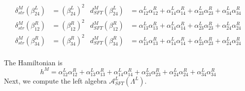 \documentclass[a4paper,final, reqno]{amsart}
\theoremstyle{plain}
\theoremstyle{definition}
\newcommand{\A}{\mathcal{A}}
\begin{document}
\begin{align*}
			\delta_{str}^M(\beta_{24}^L) &= \left(\beta_{24}^L\right)^2 & d_{SFT}^M(\beta_{24}^L) &= \alpha_{12}^L\alpha_{12}^R + \alpha_{14}^L\alpha_{14}^R + \alpha_{23}^L\alpha_{23}^R + \alpha_{34}^L\alpha_{34}^R \\
			\delta_{str}^M(\beta_{12}^R) &= \left(\beta_{12}^R\right)^2 & d_{SFT}^M(\beta_{12}^R) &= \alpha_{13}^L\alpha_{13}^R + \alpha_{14}^L\alpha_{14}^R + \alpha_{23}^L\alpha_{23}^R + \alpha_{24}^L\alpha_{24}^R \\
			\delta_{str}^M(\beta_{34}^R) &= \left(\beta_{34}^R\right)^2 & d_{SFT}^M(\beta_{34}^R) &= \alpha_{13}^L\alpha_{13}^R + \alpha_{14}^L\alpha_{14}^R + \alpha_{23}^L\alpha_{23}^R + \alpha_{24}^L\alpha_{24}^R \\		
		\end{align*}
		
		
		The Hamiltonian is 
		\[ h^M = \alpha_{12}^L\alpha_{12}^R + \alpha_{13}^L\alpha_{13}^R + \alpha_{14}^L\alpha_{14}^R + \alpha_{23}^L\alpha_{23}^R + \alpha_{24}^L\alpha_{24}^R + \alpha_{34}^L\alpha_{34}^R\]
		Next, we compute the left algebra $\A_{SFT}^L(\Lambda^L)$. 
		
\end{document}
